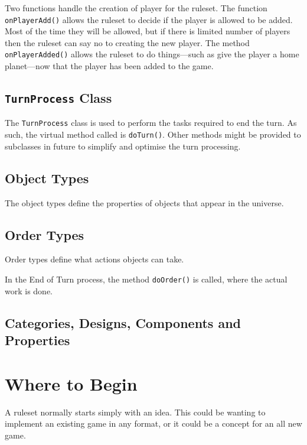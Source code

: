 \documentclass[a4paper,11pt]{report}
\newcommand{\codename}[1]{\texttt{#1}}
\begin{document}
Two functions handle the creation of player for the ruleset.  The function \codename{onPlayerAdd()} allows the ruleset to decide if the player is allowed to be added. Most of the time they will be allowed, but if there is limited number of players then the ruleset can say no to creating the new player. The method \codename{onPlayerAdded()} allows the ruleset to do things---such as give the player a home planet---now that the player has been added to the game.

\section{\codename{TurnProcess} Class}
\label{sec:turn-process}

The \codename{TurnProcess} class is used to perform the tasks required to end the turn. As such, the virtual method called is \codename{doTurn()}.  Other methods might be provided to subclasses in future to simplify and optimise the turn processing.

\section{Object Types}
\label{sec:object-types}

The object types define the properties of objects that appear in the universe.

\section{Order Types}
\label{sec:order-types}

Order types define what actions objects can take.

In the End of Turn process, the method \codename{doOrder()} is called, where the actual work is done.

\section{Categories, Designs, Components and Properties}
\label{sec:designs-components-properties}

\chapter{Where to Begin}
\label{chap:begin}

A ruleset normally starts simply with an idea. This could be wanting to implement an existing game in any format, or it could be a concept for an all new game.
\end{document}
